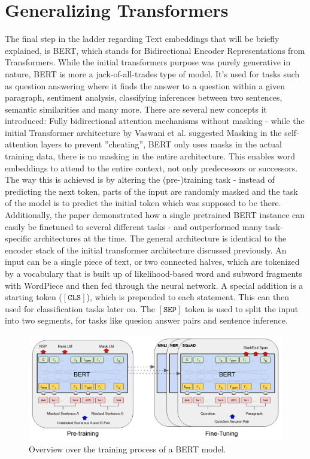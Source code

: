 \documentclass[draft,final]{vutinfth} %
\begin{document}
\section{Generalizing Transformers}
The final step in the ladder regarding Text embeddings that will be briefly explained, is BERT, which stands for Bidirectional Encoder Representations from Transformers. While the initial transformers purpose was purely generative in nature, BERT is more a jack-of-all-trades type of model. It's used for tasks such as question answering where it finds the answer to a question within a given paragraph, sentiment analysis, classifying inferences between two sentences, semantic similarities and many more. There are several new concepts it introduced: Fully bidirectional attention mechanisms without masking - while the initial Transformer architecture by Vaswani et al. suggested Masking in the self-attention layers to prevent ''cheating'', BERT only uses masks in the actual training data, there is no masking in the entire architecture. This enables word embeddings to attend to the entire context, not only predecessors or successors. The way this is achieved is by altering the (pre-)training task - instead of predicting the next token, parts of the input are randomly masked and the task of the model is to predict the initial token which was supposed to be there. Additionally, the paper demonstrated how a single pretrained BERT instance can easily be finetuned to several different tasks - and outperformed many task-specific architectures at the time. The general architecture is identical to the encoder stack of the initial transformer architecture discussed previously. An input can be a single piece of text, or two connected halves, which are tokenized by a vocabulary that is built up of likelihood-based word and subword fragments with WordPiece \cite{wu_googles_2016} and then fed through the neural network. A special addition is a starting token ($\mathtt{[CLS]}$), which is prepended to each statement. This can then used for classification tasks later on. The $\mathtt{[SEP]}$ token is used to split the input into two segments, for tasks like quesion answer pairs and sentence inference. 
\begin{figure}[h!]
    \centering
    \includegraphics[width=0.9\linewidth]{thesis-figures/BERT-Architecture.png}
    \caption{Overview over the training process of a BERT model. \cite[p. 4173]{BERT}}
    \label{fig:BERT-training-setup}
\end{figure}
\end{document}
